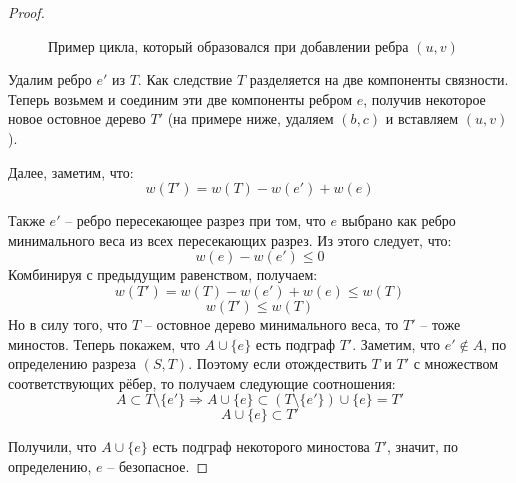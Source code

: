 \begin{proof}
\begin{figure}

        \caption{Пример цикла, который образовался при добавлении ребра $(u, v)$}
    \end{figure}

    Удалим ребро $e'$ из $T$. Как следствие $T$ разделяется на две компоненты связности. Теперь возьмем и соединим эти две компоненты ребром $e$, получив некоторое новое остовное дерево $T'$ (на примере ниже, удаляем $(b, c)$ и вставляем $(u, v)$).

    Далее, заметим, что:
    \begin{equation*}
        w(T') = w(T) - w(e') + w(e)
    \end{equation*}

    Также $e'$ -- ребро пересекающее разрез при том, что $e$ выбрано как ребро минимального веса из всех пересекающих разрез. Из этого следует, что:
    \begin{equation*}
        w(e) - w(e') \leq 0
    \end{equation*}
    Комбинируя с предыдущим равенством, получаем:
    \begin{equation*}
        w(T') = w(T) - w(e') + w(e) \leq w(T)
    \end{equation*}
    \begin{equation*}
        w(T') \leq w(T)
    \end{equation*}
    Но в силу того, что $T$ -- остовное дерево минимального веса, то $T'$ -- тоже миностов. Теперь покажем, что $A \cup \{e\}$ есть подграф $T'$.
    Заметим, что $e' \not\in A$, по определению разреза $(S, T)$. Поэтому если отождествить $T$ и $T'$ с множеством соответствующих рёбер, то получаем следующие соотношения:
    \begin{equation*}
        A \subset T \setminus \{ e' \} \Rightarrow A \cup \{ e \} \subset (T \setminus \{e'\}) \cup \{ e \} = T'
    \end{equation*}
    \begin{equation*}
        A \cup \{ e \} \subset T'
    \end{equation*}

    Получили, что $A \cup \{e\}$ есть подграф некоторого миностова $T'$, значит, по определению, $e$ -- безопасное.

\end{proof}

